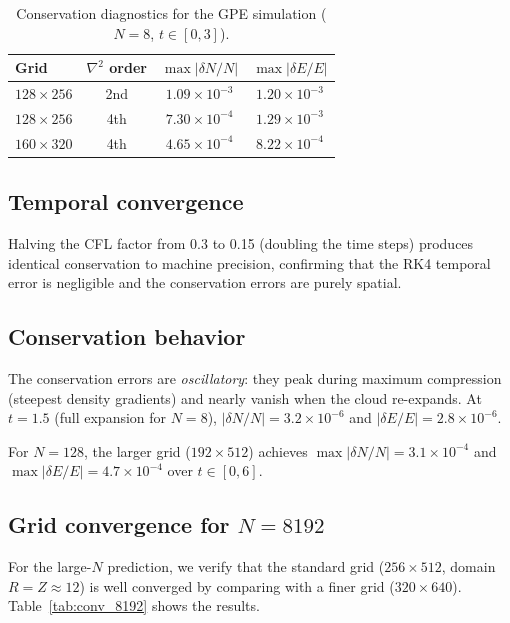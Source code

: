 \documentclass[aps,prl,onecolumn,superscriptaddress,longbibliography,nofootinbib]{revtex4-2}
\begin{document}
\begin{table}[h]
\caption{Conservation diagnostics for the GPE simulation ($N=8$,
$t\in[0,3]$).}
\label{tab:convergence}
\begin{ruledtabular}
\begin{tabular}{lccc}
Grid & $\nabla^2$ order & $\max|\delta N/N|$ & $\max|\delta E/E|$\\
\hline
$128\times 256$ & 2nd & $1.09\times10^{-3}$ & $1.20\times10^{-3}$\\
$128\times 256$ & 4th & $7.30\times10^{-4}$ & $1.29\times10^{-3}$\\
$160\times 320$ & 4th & $4.65\times10^{-4}$ & $8.22\times10^{-4}$\\
\end{tabular}
\end{ruledtabular}
\end{table}

\subsection{Temporal convergence}

Halving the CFL factor from 0.3 to 0.15 (doubling the time steps)
produces identical conservation to machine precision, confirming that
the RK4 temporal error is negligible and the conservation errors are
purely spatial.

\subsection{Conservation behavior}

The conservation errors are \emph{oscillatory}: they peak during
maximum compression (steepest density gradients) and nearly vanish
when the cloud re-expands.  At $t=1.5$ (full expansion for $N=8$),
$|\delta N/N|=3.2\times10^{-6}$ and $|\delta E/E|=2.8\times10^{-6}$.

For $N=128$, the larger grid ($192\times 512$) achieves
$\max|\delta N/N|=3.1\times10^{-4}$ and
$\max|\delta E/E|=4.7\times10^{-4}$ over $t\in[0,6]$.

\subsection{Grid convergence for $N=8192$}

For the large-$N$ prediction, we verify that the standard grid
($256\times 512$, domain $R=Z\approx 12$) is well converged by
comparing with a finer grid ($320\times 640$).
Table~\ref{tab:conv_8192} shows the results.
\end{document}
